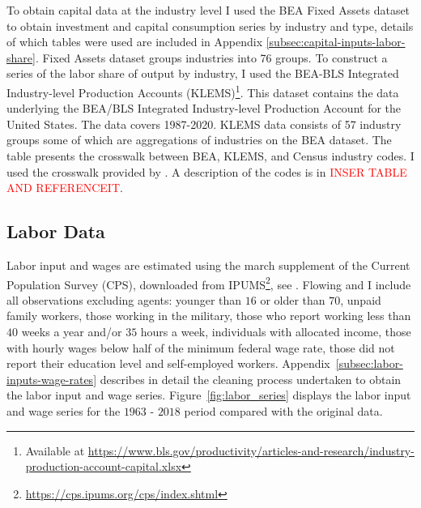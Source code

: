 \documentclass[12pt]{article}
\begin{document}
To obtain capital data at the industry level I used the BEA Fixed Assets dataset to obtain investment and capital consumption series by industry and type, details of which tables were used are included in Appendix \ref{subsec:capital-inputs-labor-share}. Fixed Assets dataset groups industries into 76 groups. To construct a series of the labor share of output by industry, I used the BEA-BLS Integrated Industry-level Production Accounts (KLEMS)\footnote{Available at \url{https://www.bls.gov/productivity/articles-and-research/industry-production-account-capital.xlsx}}. This dataset contains the data underlying the BEA/BLS Integrated Industry-level Production Account for the United States. The data covers 1987-2020. KLEMS data consists of 57 industry groups some of which are aggregations of industries on the BEA dataset. The table 
presents the crosswalk between BEA, KLEMS, and Census industry codes. I used the crosswalk provided by \citep{acemoglu2020unpacking}. A description of the codes is in \textcolor{red}{INSER TABLE AND REFERENCEIT}.

\subsection{Labor Data}\label{sec:labor_data}

Labor input and wages are estimated using the march supplement of the Current Population Survey (CPS), downloaded from IPUMS\footnote{\url{https://cps.ipums.org/cps/index.shtml}}, see \citet{flood2015integrated}. Flowing \citep{krusell2000capital} and \citep{ohanian2021revisiting} I include all observations excluding agents: younger than $16$ or older than $70$, unpaid family workers, those working in the military, those who report working less than $40$ weeks a year and/or $35$ hours a week, individuals with allocated income, those with hourly wages below half of the minimum federal wage rate, those did not report their education level and self-employed workers. Appendix~\ref{subsec:labor-inputs-wage-rates} describes in detail the cleaning process undertaken to obtain the labor input and wage series. Figure~\ref{fig:labor_series} displays the labor input and wage series for the $1963$ - $2018$ period compared with the original data.
\end{document}
